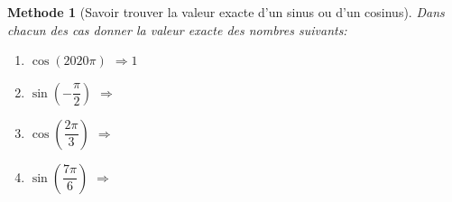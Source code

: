 \documentclass[10pt,a4paper]{article}
\theoremstyle{break}
\newtheorem{Meth}{Methode}
\begin{document}
		\newpage

	\begin{Meth}[Savoir trouver la valeur exacte d'un sinus ou d'un cosinus]
		Dans chacun des cas donner la valeur exacte des nombres suivants:
		\begin{multicols}{4}
			\begin{enumerate}
				\item $\cos(2020\pi)$ $\Rightarrow$$1$
				\item $\sin(-\dfrac{\pi}{2})$ $\Rightarrow$ $ $
				\item $\cos(\dfrac{2\pi}{3})$ $\Rightarrow$ $ $
				\item $\sin(\dfrac{7\pi}{6})$ $\Rightarrow$ $ $
			\end{enumerate}
		\end{multicols}
\end{Meth}		
\end{document}
